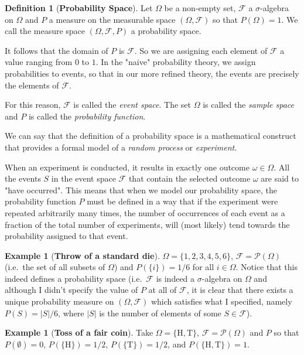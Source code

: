 \documentclass{article}
\theoremstyle{definition}
\newtheorem{definition}[theorem]{Definition}
\newtheorem{example}[theorem]{Example}
\begin{document}
\begin{definition}[\textbf{Probability Space}]
    Let $\Omega$ be a non-empty set, $\mathcal{F}$ a $\sigma$-algebra
    on $\Omega$ and $P$ a measure on the measurable space $(\Omega, \mathcal{F})$ so that $P(\Omega)=1$. We
    call the measure space $(\Omega, \mathcal{F}, P)$ a probability space.
\end{definition}

It follows that the domain of $P$ is $\mathcal{F}$. So we are assigning each element of $\mathcal{F}$ a value
ranging from $0$ to $1$. In the "naive" probability theory, we assign probabilities to events, so that in our
more refined theory, the events are precisely the elements of $\mathcal{F}$.

For this reason, $\mathcal{F}$ is called the \textit{event space}. The set $\Omega$ is called the \textit{sample space}
and $P$ is called the \textit{probability function}.

We can say that the definition of a probability space is a mathematical construct that provides a formal model
of a \textit{random process} or \textit{experiment}.

When an experiment is conducted, it results in exactly one outcome $\omega \in \Omega$. All the events $S$ in the event space
$\mathcal{F}$ that contain the selected outcome $\omega$ are said to "have occurred". This means that when we model our
probability space, the probability function $P$ must be defined in a way that if the experiment were repeated arbitrarily
many times, the number of occurrences of each event as a fraction of the total number of experiments, will (most likely)
tend towards the probability assigned to that event.

\begin{example}[\textbf{Throw of a standard die}]
    $\Omega = \{1, 2, 3, 4, 5, 6\}$, $\mathcal{F} = \mathcal{P}(\Omega)$
    (i.e.\ the set of all subsets of $\Omega$) and $P(\{ i \}) = 1/6$ for all $i \in \Omega$. Notice that
    this indeed defines a probability space (i.e.\ $\mathcal{F}$ is indeed a $\sigma$-algebra on $\Omega$ and although
    I didn't specify the value of $P$ at all of $\mathcal{F}$, it is clear that there exists a unique probability measure
    on $(\Omega, \mathcal{F})$ which satisfies what I specified, namely $P(S) = |S|/6$, where $|S|$ is the number of elements
    of some $S \in \mathcal{F}$).
\end{example}

\begin{example}[\textbf{Toss of a fair coin}]
    Take $\Omega = \{ \text{H}, \text{T} \}$, $\mathcal{F} = \mathcal{P}(\Omega)$ and $P$
    so that $P(\emptyset) = 0$, $P(\{ \text{H} \}) = 1/2$, $P(\{ \text{T} \}) = 1/2$, and $P(\{ \text{H}, \text{T} \}) = 1$.
\end{example}
\end{document}
